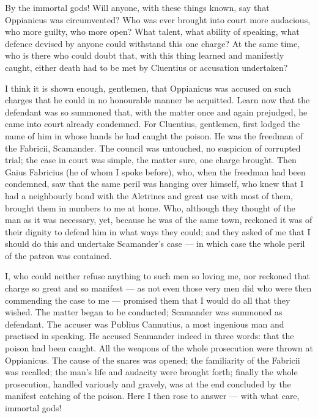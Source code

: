  By the immortal gods! Will anyone, with these things known, say that Oppianicus was circumvented? Who was ever brought into court more audacious, who more guilty, who more open? What talent, what ability of speaking, what defence devised by anyone could withstand this one charge? At the same time, who is there who could doubt that, with this thing learned and manifestly caught, either death had to be met by Cluentius or accusation undertaken?

 I think it is shown enough, gentlemen, that Oppianicus was accused on such charges that he could in no honourable manner be acquitted. Learn now that the defendant was so summoned that, with the matter once and again prejudged, he came into court already condemned. For Cluentius, gentlemen, first lodged the name of him in whose hands he had caught the poison. He was the freedman of the Fabricii, Scamander. The council was untouched, no suspicion of corrupted trial; the case in court was simple, the matter sure, one charge brought. Then Gaius Fabricius (he of whom I spoke before), who, when the freedman had been condemned, saw that the same peril was hanging over himself, who knew that I had a neighbourly bond with the Aletrines and great use with most of them, brought them in numbers to me at home. Who, although they thought of the man as it was necessary, yet, because he was of the same town, reckoned it was of their dignity to defend him in what ways they could; and they asked of me that I should do this and undertake Scamander's case --- in which case the whole peril of the patron was contained.

 I, who could neither refuse anything to such men so loving me, nor reckoned that charge so great and so manifest --- as not even those very men did who were then commending the case to me --- promised them that I would do all that they wished. The matter began to be conducted; Scamander was summoned as defendant. The accuser was Publius Cannutius, a most ingenious man and practised in speaking. He accused Scamander indeed in three words: that the poison had been caught. All the weapons of the whole prosecution were thrown at Oppianicus. The cause of the snares was opened; the familiarity of the Fabricii was recalled; the man's life and audacity were brought forth; finally the whole prosecution, handled variously and gravely, was at the end concluded by the manifest catching of the poison. Here I then rose to answer --- with what care, immortal gods!

